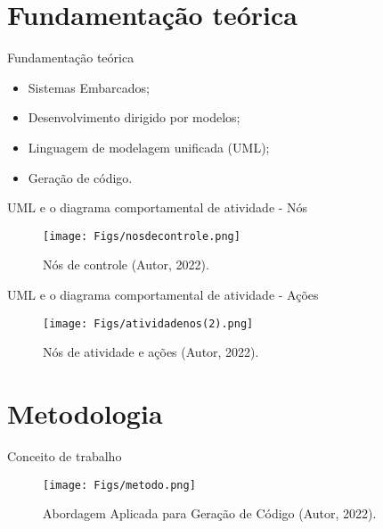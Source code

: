 \documentclass[handout,aspectratio = 169]{beamer}
\begin{document}

\section{Fundamentação teórica}
\begin{frame}{Fundamentação teórica}
    \begin{itemize}
        \item Sistemas Embarcados;
        \item Desenvolvimento dirigido por modelos;
        \item Linguagem de modelagem unificada (UML);
        \item Geração de código.
    \end{itemize}
\end{frame}

\begin{frame}{UML e o diagrama comportamental de atividade - Nós}
    \begin{figure}
            \centering
             \texttt{[image: Figs/nosdecontrole.png]}
            \caption{Nós de controle (Autor, 2022).}
    \end{figure}
\end{frame}

\begin{frame}{UML e o diagrama comportamental de atividade - Ações}
    \begin{figure}
            \centering
             \texttt{[image: Figs/atividadenos(2).png]}
            \caption{Nós de atividade e ações (Autor, 2022).}
    \end{figure}
\end{frame}

\section{Metodologia}
\begin{frame}{Conceito de trabalho}
    \begin{figure}
            \centering
             \texttt{[image: Figs/metodo.png]}
            \caption{Abordagem Aplicada para Geração de Código (Autor, 2022).}
        \end{figure}
\end{frame}
\end{document}
